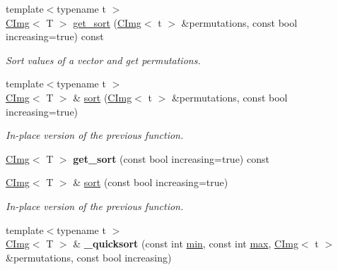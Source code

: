 \begin{DoxyCompactItemize}
\item 
\hypertarget{structcimg__library_1_1_c_img_a208a8620067152068c648bd84bf84868}{{\footnotesize template$<$typename t $>$ }\\\hyperlink{structcimg__library_1_1_c_img}{C\-Img}$<$ T $>$ \hyperlink{structcimg__library_1_1_c_img_a208a8620067152068c648bd84bf84868}{get\-\_\-sort} (\hyperlink{structcimg__library_1_1_c_img}{C\-Img}$<$ t $>$ \&permutations, const bool increasing=true) const }\label{structcimg__library_1_1_c_img_a208a8620067152068c648bd84bf84868}

\begin{DoxyCompactList}\small\item\em Sort values of a vector and get permutations. \end{DoxyCompactList}\item 
\hypertarget{structcimg__library_1_1_c_img_a263e8361662bdd550a65666df0c9de7b}{{\footnotesize template$<$typename t $>$ }\\\hyperlink{structcimg__library_1_1_c_img}{C\-Img}$<$ T $>$ \& \hyperlink{structcimg__library_1_1_c_img_a263e8361662bdd550a65666df0c9de7b}{sort} (\hyperlink{structcimg__library_1_1_c_img}{C\-Img}$<$ t $>$ \&permutations, const bool increasing=true)}\label{structcimg__library_1_1_c_img_a263e8361662bdd550a65666df0c9de7b}

\begin{DoxyCompactList}\small\item\em In-\/place version of the previous function. \end{DoxyCompactList}\item 
\hypertarget{structcimg__library_1_1_c_img_acc9d184a37f451541ee2f6d846107648}{\hyperlink{structcimg__library_1_1_c_img}{C\-Img}$<$ T $>$ {\bfseries get\-\_\-sort} (const bool increasing=true) const }\label{structcimg__library_1_1_c_img_acc9d184a37f451541ee2f6d846107648}

\item 
\hypertarget{structcimg__library_1_1_c_img_a9d2f2bc26cc2036abd75bdb7cae4882c}{\hyperlink{structcimg__library_1_1_c_img}{C\-Img}$<$ T $>$ \& \hyperlink{structcimg__library_1_1_c_img_a9d2f2bc26cc2036abd75bdb7cae4882c}{sort} (const bool increasing=true)}\label{structcimg__library_1_1_c_img_a9d2f2bc26cc2036abd75bdb7cae4882c}

\begin{DoxyCompactList}\small\item\em In-\/place version of the previous function. \end{DoxyCompactList}\item 
\hypertarget{structcimg__library_1_1_c_img_a4cd5d84f00e6a075c27fd4a834cdfa5a}{{\footnotesize template$<$typename t $>$ }\\\hyperlink{structcimg__library_1_1_c_img}{C\-Img}$<$ T $>$ \& {\bfseries \-\_\-quicksort} (const int \hyperlink{structcimg__library_1_1_c_img_a6f6b87ed92f562c901433d794a15054a}{min}, const int \hyperlink{structcimg__library_1_1_c_img_a4ed81efb50c6fc79bbc4980d501b87d1}{max}, \hyperlink{structcimg__library_1_1_c_img}{C\-Img}$<$ t $>$ \&permutations, const bool increasing)}\label{structcimg__library_1_1_c_img_a4cd5d84f00e6a075c27fd4a834cdfa5a}


\end{DoxyCompactItemize}
